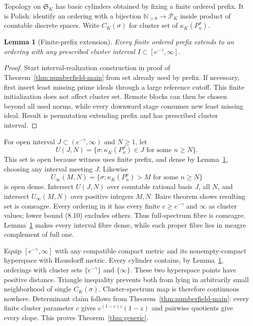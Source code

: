 \documentclass[11pt]{article}
\newtheorem{lemma}[theorem]{Lemma}
\theoremstyle{definition}
\theoremstyle{remark}
\newcommand{\N}{\mathbb N}
\begin{document}
Topology on $\mathfrak S_K$ has basic cylinders obtained by fixing a finite ordered prefix.
It is Polish: identify an ordering with a bijection $\N_{>0}\to\mathcal P_K$ inside product of
countable discrete spaces.  Write $C_K(\sigma)$ for cluster set of $\kappa_K(P_n^\sigma)$.

\begin{lemma}[Finite-prefix extension]
\label{lem:prefix}
Every finite ordered prefix extends to an ordering with any prescribed cluster interval
$I\subset[e^{-\gamma},\infty]$.
\end{lemma}

\begin{proof}
Start interval-realization construction in proof of Theorem~\ref{thm:numberfield-main} from set
already used by prefix.  If necessary, first insert least missing prime ideals through a large
reference cutoff.  This finite initialization does not affect cluster set.  Remote blocks can
then be chosen beyond all used norms, while every downward stage consumes new least missing
ideal.  Result is permutation extending prefix and has prescribed cluster interval.
\end{proof}

For open interval $J\subset(e^{-\gamma},\infty)$ and $N\geq1$, let
\[
 U(J,N)=\{\sigma:\kappa_K(P_n^\sigma)\in J\text{ for some }n\geq N\}.
\]
This set is open because witness uses finite prefix, and dense by
Lemma~\ref{lem:prefix}, choosing any interval meeting $J$.  Likewise
\[
 U_\infty(M,N)=\{\sigma:\kappa_K(P_n^\sigma)>M\text{ for some }n\geq N\}
\]
is open dense.  Intersect $U(J,N)$ over countable rational basis $J$, all $N$, and intersect
$U_\infty(M,N)$ over positive integers $M,N$.  Baire theorem shows resulting set is comeagre.
Every ordering in it has every finite $c\geq e^{-\gamma}$ and $\infty$ as cluster values; lower
bound (8.10) excludes others.  Thus full-spectrum fibre is comeagre.  Lemma~\ref{lem:prefix}
makes every interval fibre dense, while each proper fibre lies in meagre complement of full one.

Equip $[e^{-\gamma},\infty]$ with any compatible compact metric and its nonempty-compact
hyperspace with Hausdorff metric.  Every cylinder contains, by Lemma~\ref{lem:prefix}, orderings
with cluster sets $\{e^{-\gamma}\}$ and $\{\infty\}$.  These two hyperspace points have positive
distance.  Triangle inequality prevents both from lying in arbitrarily small neighborhood of
single $C_K(\sigma)$.  Cluster-spectrum map is therefore continuous nowhere.  Determinant
claim follows from Theorem~\ref{thm:numberfield-main}: every finite cluster parameter $c$ gives
$e^{(1-c)z}(1-z)$ and pairwise quotients give every slope.  This proves
Theorem~\ref{thm:generic}.
\end{document}
